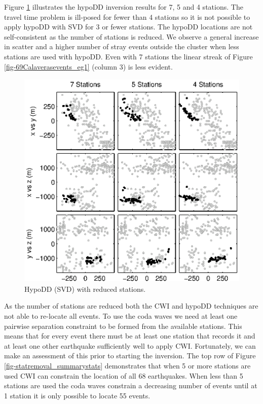 \documentclass[extra]{gji}
\begin{document}
Figure \ref{fig-HYPODDreducesstats} illustrates the hypoDD inversion
results for 7, 5 and 4 stations. The travel time problem is
ill-posed for fewer than 4 stations so it is not possible to apply
hypoDD with SVD for 3 or fewer stations.  The hypoDD locations are
not self-consistent as the number of stations is reduced. We observe
a general increase in scatter and a higher number of stray events
outside the cluster when less stations are used with hypoDD. Even
with 7 stations the linear streak of Figure
\ref{fig-69Calaverasevents_eg1} (column 3) is less evident.


\begin{figure}
\includegraphics[height = 25pc]{diags/CalaverasLoc3_hypoDD_SVD.eps}
\caption{HypoDD (SVD) with reduced stations.}
\label{fig-HYPODDreducesstats}
\end{figure}


As the number of stations are reduced both the CWI and hypoDD
techniques are not able to re-locate all events. To use the coda
waves we need at least one pairwise separation constraint to be
formed from the available stations. This means that for every event
there must be at least one station that records it and at least one
other earthquake sufficiently well to apply CWI. Fortunately, we can
make an assessment of this prior to starting the inversion. The top
row of Figure \ref{fig-statremoval_summarystats} demonstrates that
when 5 or more stations are used CWI can constrain the location of
all 68 earthquakes. When less than 5 stations are used the coda
waves constrain a decreasing number of events until at 1 station it
is only possible to locate 55 events.
\end{document}

